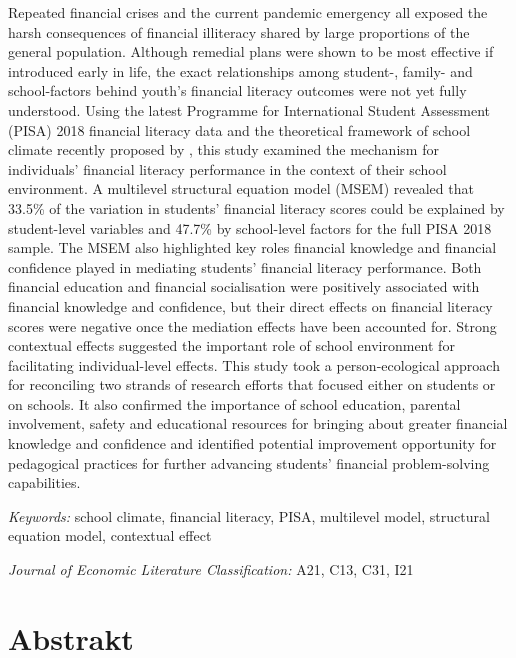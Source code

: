 \documentclass[a4paper,11pt,UKenglish,twoside,openright]{report}\usepackage[]{graphicx}\usepackage[]{color}
\begin{document}
\noindent Repeated financial crises and the current pandemic emergency all exposed the harsh consequences of financial illiteracy shared by large proportions of the general population. Although remedial plans were shown to be most effective if introduced early in life, the exact relationships among student-, family- and school-factors behind youth's financial literacy outcomes were not yet fully understood. Using the latest Programme for International Student Assessment (PISA) 2018 financial literacy data and the theoretical framework of school climate recently proposed by \textcite{wang:2016}, this study examined the mechanism for individuals' financial literacy performance in the context of their school environment. A multilevel structural equation model (MSEM) revealed that 33.5\% of the variation in students' financial literacy scores could be explained by student-level variables and 47.7\% by school-level factors for the full PISA 2018 sample. The MSEM also highlighted key roles financial knowledge and financial confidence played in mediating students' financial literacy performance. Both financial education and financial socialisation were positively associated with financial knowledge and confidence, but their direct effects on financial literacy scores were negative once the mediation effects have been accounted for. Strong contextual effects suggested the important role of school environment for facilitating individual-level effects. This study took a person-ecological approach for reconciling two strands of research efforts that focused either on students or on schools. It also confirmed the importance of school education, parental involvement, safety and educational resources for bringing about greater financial knowledge and confidence and identified potential improvement opportunity for pedagogical practices for further advancing students' financial problem-solving capabilities.

\textit{Keywords:} school climate, financial literacy, PISA, multilevel model, structural equation model, contextual effect

\textit{Journal of Economic Literature Classification:} A21, C13, C31, I21
\setcounter{page}{8}


\chapter*{Abstrakt}
\label{Ab.2}
\end{document}
